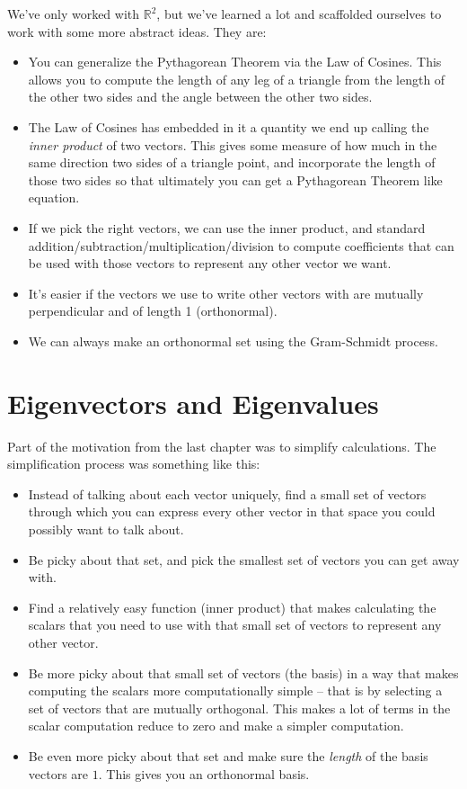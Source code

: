 \documentclass[
]{book}
\providecommand{\tightlist}{%
  \setlength{\itemsep}{0pt}\setlength{\parskip}{0pt}}
\begin{document}
We've only worked with \(\mathbb{R}^2\), but we've learned a lot and scaffolded ourselves to work with some more abstract ideas. They are:

\begin{itemize}
\tightlist
\item
  You can generalize the Pythagorean Theorem via the Law of Cosines. This allows you to compute the length of any leg of a triangle from the length of the other two sides and the angle between the other two sides.
\item
  The Law of Cosines has embedded in it a quantity we end up calling the \emph{inner product} of two vectors. This gives some measure of how much in the same direction two sides of a triangle point, and incorporate the length of those two sides so that ultimately you can get a Pythagorean Theorem like equation.
\item
  If we pick the right vectors, we can use the inner product, and standard addition/subtraction/multiplication/division to compute coefficients that can be used with those vectors to represent any other vector we want.
\item
  It's easier if the vectors we use to write other vectors with are mutually perpendicular and of length 1 (orthonormal).
\item
  We can always make an orthonormal set using the Gram-Schmidt process.
\end{itemize}

\hypertarget{eigenvectors-and-eigenvalues}{%
\chapter{Eigenvectors and Eigenvalues}\label{eigenvectors-and-eigenvalues}}

Part of the motivation from the last chapter was to simplify calculations. The simplification process was something like this:

\begin{itemize}
\tightlist
\item
  Instead of talking about each vector uniquely, find a small set of vectors through which you can express every other vector in that space you could possibly want to talk about.
\item
  Be picky about that set, and pick the smallest set of vectors you can get away with.
\item
  Find a relatively easy function (inner product) that makes calculating the scalars that you need to use with that small set of vectors to represent any other vector.
\item
  Be more picky about that small set of vectors (the basis) in a way that makes computing the scalars more computationally simple -- that is by selecting a set of vectors that are mutually orthogonal. This makes a lot of terms in the scalar computation reduce to zero and make a simpler computation.
\item
  Be even more picky about that set and make sure the \emph{length} of the basis vectors are \(1\). This gives you an orthonormal basis.
\end{itemize}
\end{document}

